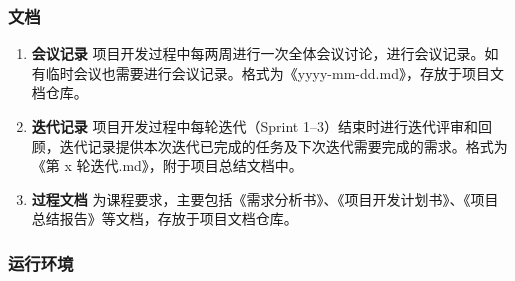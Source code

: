 \subsubsection{文档}

\begin{enumerate}[(1)]
  \item \textbf{会议记录}
  项目开发过程中每两周进行一次全体会议讨论，进行会议记录。如有临时会议也需要进行会议记录。格式为《yyyy-mm-dd.md》，存放于项目文档仓库。

  \item \textbf{迭代记录}
  项目开发过程中每轮迭代（Sprint 1--3）结束时进行迭代评审和回顾，迭代记录提供本次迭代已完成的任务及下次迭代需要完成的需求。格式为《第 x 轮迭代.md》，附于项目总结文档中。

  \item \textbf{过程文档}
  为课程要求，主要包括《需求分析书》、《项目开发计划书》、《项目总结报告》等文档，存放于项目文档仓库。
\end{enumerate}

\subsubsection{运行环境}

